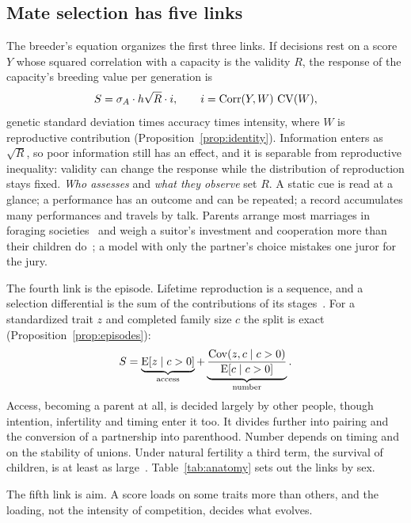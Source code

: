 \subsection{Mate selection has five links}\label{sec:decomp}

The breeder's equation organizes the first three links. If decisions rest on a score $Y$ whose squared correlation with a
capacity is the validity $R$, the response of the capacity's breeding value per generation is
\begin{equation}
S=\sigma_A\cdot h\sqrt R\cdot i,\qquad i=\operatorname{Corr}(Y,W)\,\operatorname{CV}(W),\label{eq:mainidentity}
\end{equation}
genetic standard deviation times accuracy times intensity, where $W$ is reproductive contribution
(Proposition~\ref{prop:identity}). Information enters as $\sqrt R$, so poor information still has an effect, and it is
separable from reproductive inequality: validity can change the response while the distribution of reproduction stays fixed.
\emph{Who assesses} and \emph{what they observe} set $R$. A static cue is read at a glance; a performance has an outcome and
can be repeated; a record accumulates many performances and travels by talk. Parents arrange most marriages in foraging
societies~\cite{walker2011,apostolou2007} and weigh a suitor's investment and cooperation more than their children
do~\cite{buunk2008}; a model with only the partner's choice mistakes one juror for the jury.

The fourth link is the episode. Lifetime reproduction is a sequence, and a selection differential is the sum of the
contributions of its stages~\cite{arnold1984}. For a standardized trait $z$ and completed family size $c$ the split is exact
(Proposition~\ref{prop:episodes}):
\begin{equation}
S=\underbrace{\operatorname{E}[z\mid c>0]}_{\text{access}}+\underbrace{\frac{\operatorname{Cov}(z,c\mid c>0)}{\operatorname{E}[c\mid c>0]}}_{\text{number}}.\label{eq:split}
\end{equation}
Access, becoming a parent at all, is decided largely by other people, though intention, infertility and timing enter it
too. It divides further into pairing and the conversion of a partnership into parenthood. Number depends on timing and on
the stability of unions. Under natural fertility a third term, the survival of children, is at least as
large~\cite{volk2013,sear2008}. Table~\ref{tab:anatomy} sets out the links by sex.

The fifth link is aim. A score loads on some traits more than others, and the loading, not the intensity of competition,
decides what evolves.


